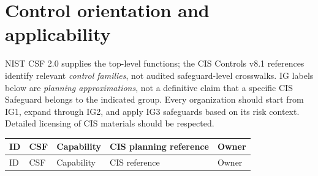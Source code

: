 \documentclass[11pt,oneside]{report}
\begin{document}
\section{Control orientation and applicability}
NIST CSF 2.0 supplies the top-level functions\cite{nist}; the CIS Controls v8.1 references\cite{cis} identify relevant \emph{control families}, not audited safeguard-level crosswalks. IG labels below are \emph{planning approximations}, not a definitive claim that a specific CIS Safeguard belongs to the indicated group. Every organization should start from IG1, expand through IG2, and apply IG3 safeguards based on its risk context. Detailed licensing of CIS materials should be respected.
\small
\begin{longtable}{P{0.095\textwidth}P{0.125\textwidth}P{0.25\textwidth}P{0.21\textwidth}P{0.18\textwidth}}
\toprule ID & CSF & Capability & CIS planning reference & Owner\\\midrule\endfirsthead
\toprule ID & CSF & Capability & CIS reference & Owner\\\midrule\endhead


\end{longtable}
\end{document}
